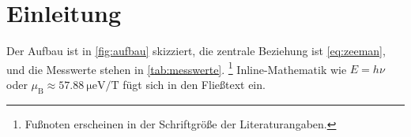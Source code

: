 \section{Einleitung}

\blindtext

Der Aufbau ist in \cref{fig:aufbau} skizziert, die zentrale Beziehung ist
\cref{eq:zeeman}, und die Messwerte stehen in \cref{tab:messwerte}.%
\footnote{Fußnoten erscheinen in der Schriftgröße der Literaturangaben.}
Inline-Mathematik wie $E = h\nu$ oder $\mu_\mathrm{B} \approx
\qty{57.88}{\micro\electronvolt\per\tesla}$ fügt sich in den Fließtext ein.

\blindtext
